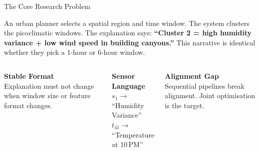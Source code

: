 \documentclass[aspectratio=169]{beamer}
\begin{document}
{
\begin{frame}{The Core Research Problem}
\begin{tcolorbox}[enhanced,boxrule=1.5pt,arc=3pt,
    colback=cdark!80,colframe=cteal,top=5pt,bottom=5pt,left=6pt,right=6pt]
\small\color{caccent}
An urban planner selects a spatial region and time window.
The system clusters the picoclimatic windows.
The explanation says:\space
\textcolor{cteal}{\bfseries``Cluster 2 = high humidity variance + low wind speed in building canyons.''}
\space This narrative is identical whether they pick a 1-hour or 6-hour window.
\end{tcolorbox}
\vspace{0.35cm}
\begin{columns}[T]
  \begin{tcolorbox}[enhanced,boxrule=1.2pt,arc=2pt,colback=cdark!80,colframe=cteal,top=4pt,bottom=4pt,left=4pt,right=4pt]
    {\color{cteal}\bfseries\small Stable Format}\\[2pt]
    {\color{caccent}\footnotesize Explanation must not change when window size or feature format changes.}
  \end{tcolorbox}
  \begin{tcolorbox}[enhanced,boxrule=1.2pt,arc=2pt,colback=cdark!80,colframe=cwarn,top=4pt,bottom=4pt,left=4pt,right=4pt]
    {\color{cwarn}\bfseries\small Sensor Language}\\[2pt]
    {\color{caccent}\footnotesize $s_1 \to$ ``Humidity Variance''\\$t_{41} \to$ ``Temperature at 10\,PM''}
  \end{tcolorbox}
  \begin{tcolorbox}[enhanced,boxrule=1.2pt,arc=2pt,colback=cdark!80,colframe=cteal,top=4pt,bottom=4pt,left=4pt,right=4pt]
    {\color{cteal}\bfseries\small Alignment Gap}\\[2pt]
    {\color{caccent}\footnotesize Sequential pipelines break alignment. Joint optimisation is the target.}
  \end{tcolorbox}
\end{columns}
\end{frame}}
\end{document}
